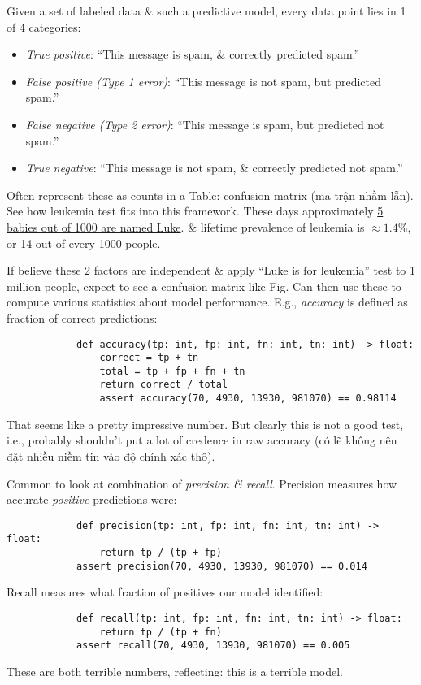 \documentclass{article}
\begin{document}
\begin{itemize}
\begin{itemize}
		Given a set of labeled data \& such a predictive model, every data point lies in 1 of 4 categories:
		\begin{itemize}
			\item {\it True positive}: ``This message is spam, \& correctly predicted spam.''
			\item {\it False positive (Type 1 error)}: ``This message is not spam, but predicted spam.''
			\item {\it False negative (Type 2 error)}: ``This message is spam, but predicted not spam.''
			\item {\it True negative}: ``This message is not spam, \& correctly predicted not spam.''
		\end{itemize}
		Often represent these as counts in a {\sf Table: confusion matrix} (ma trận nhầm lẫn). See how leukemia test fits into this framework. These days approximately \href{https://www.babycenter.com/baby-names-luke-2918.htm}{5 babies out of 1000 are named Luke}. \& lifetime prevalence of leukemia is $\approx1.4$\%, or \href{https://seer.cancer.gov/statfacts/html/leuks.html}{14 out of every 1000 people}.
		
		If believe these 2 factors are independent \& apply ``Luke is for leukemia'' test to 1 million people, expect to see a confusion matrix like {\sf Fig.} Can then use these to compute various statistics about model performance. E.g., {\it accuracy} is defined as fraction of correct predictions:
		\begin{verbatim}
			def accuracy(tp: int, fp: int, fn: int, tn: int) -> float:
			    correct = tp + tn
			    total = tp + fp + fn + tn
			    return correct / total
			    assert accuracy(70, 4930, 13930, 981070) == 0.98114
		\end{verbatim}
		That seems like a pretty impressive number. But clearly this is not a good test, i.e., probably shouldn't put a lot of credence in raw accuracy (có lẽ không nên đặt nhiều niềm tin vào độ chính xác thô).
		
		Common to look at combination of {\it precision \& recall}. Precision measures how accurate {\it positive} predictions were:
		\begin{verbatim}
			def precision(tp: int, fp: int, fn: int, tn: int) -> float:
			    return tp / (tp + fp)
			assert precision(70, 4930, 13930, 981070) == 0.014
		\end{verbatim}
		Recall measures what fraction of positives our model identified:
		\begin{verbatim}
			def recall(tp: int, fp: int, fn: int, tn: int) -> float:
			    return tp / (tp + fn)
			assert recall(70, 4930, 13930, 981070) == 0.005
		\end{verbatim}
		These are both terrible numbers, reflecting: this is a terrible model.
		

\end{itemize}
\end{itemize}
\end{document}
